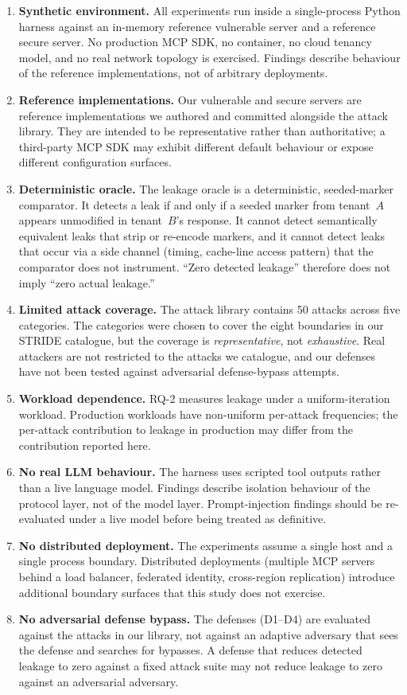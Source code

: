 \documentclass[sigconf, anonymous, natbib=false]{acmart}
\begin{document}
\begin{enumerate}
\item \textbf{Synthetic environment.}
All experiments run inside a single-process Python harness
against an in-memory reference vulnerable server and a
reference secure server. No production MCP SDK, no
container, no cloud tenancy model, and no real network
topology is exercised. Findings describe behaviour of the
reference implementations, not of arbitrary deployments.
\item \textbf{Reference implementations.}
Our vulnerable and secure servers are reference
implementations we authored and committed alongside the
attack library. They are intended to be representative
rather than authoritative; a third-party MCP SDK may
exhibit different default behaviour or expose different
configuration surfaces.
\item \textbf{Deterministic oracle.}
The leakage oracle is a deterministic, seeded-marker
comparator. It detects a leak if and only if a seeded
marker from tenant~$A$ appears unmodified in tenant~$B$'s
response. It cannot detect semantically equivalent leaks
that strip or re-encode markers, and it cannot detect leaks
that occur via a side channel (timing, cache-line access
pattern) that the comparator does not instrument.
``Zero detected leakage'' therefore does not imply
``zero actual leakage.''
\item \textbf{Limited attack coverage.}
The attack library contains 50 attacks across five
categories. The categories were chosen to cover the eight
boundaries in our STRIDE catalogue, but the coverage is
\emph{representative}, not \emph{exhaustive}. Real
attackers are not restricted to the attacks we catalogue,
and our defenses have not been tested against
adversarial defense-bypass attempts.
\item \textbf{Workload dependence.}
RQ-2 measures leakage under a uniform-iteration workload.
Production workloads have non-uniform per-attack
frequencies; the per-attack contribution to leakage in
production may differ from the contribution reported here.
\item \textbf{No real LLM behaviour.}
The harness uses scripted tool outputs rather than a live
language model. Findings describe isolation behaviour of
the protocol layer, not of the model layer. Prompt-injection
findings should be re-evaluated under a live model before
being treated as definitive.
\item \textbf{No distributed deployment.}
The experiments assume a single host and a single process
boundary. Distributed deployments (multiple MCP servers
behind a load balancer, federated identity, cross-region
replication) introduce additional boundary surfaces that
this study does not exercise.
\item \textbf{No adversarial defense bypass.}
The defenses (D1--D4) are evaluated against the attacks
in our library, not against an adaptive adversary that
sees the defense and searches for bypasses. A defense
that reduces detected leakage to zero against a fixed
attack suite may not reduce leakage to zero against an
adversarial adversary.
\end{enumerate}
\end{document}
